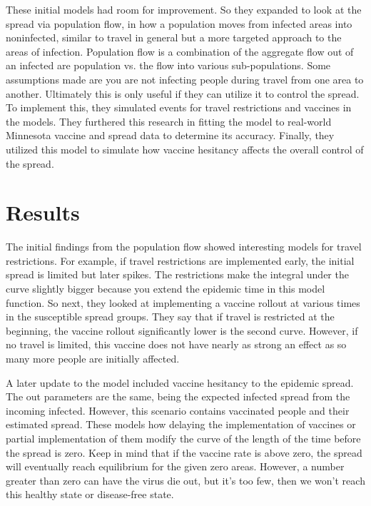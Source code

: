 \documentclass[journal,onecolumn]{IEEEtran}
\begin{document}
These initial models had room for improvement. So they expanded to look at the spread via population flow, in how a population moves from infected areas into noninfected, similar to travel in general but a more targeted approach to the areas of infection. Population flow is a combination of the aggregate flow out of an infected are population vs. the flow into various sub-populations. Some assumptions made are you are not infecting people during travel from one area to another. Ultimately this is only useful if they can utilize it to control the spread. To implement this, they simulated events for travel restrictions and vaccines in the models. They furthered this research in fitting the model to real-world Minnesota vaccine and spread data to determine its accuracy. Finally, they utilized this model to simulate how vaccine hesitancy affects the overall control of the spread. 

\section{Results}

The initial findings from the population flow showed interesting models for travel restrictions. For example, if travel restrictions are implemented early, the initial spread is limited but later spikes. The restrictions make the integral under the curve slightly bigger because you extend the epidemic time in this model function. So next, they looked at implementing a vaccine rollout at various times in the susceptible spread groups. They say that if travel is restricted at the beginning, the vaccine rollout significantly lower is the second curve. However, if no travel is limited, this vaccine does not have nearly as strong an effect as so many more people are initially affected. 

A later update to the model included vaccine hesitancy to the epidemic spread. The out parameters are the same, being the expected infected spread from the incoming infected. However, this scenario contains vaccinated people and their estimated spread. These models how delaying the implementation of vaccines or partial implementation of them modify the curve of the length of the time before the spread is zero. Keep in mind that if the vaccine rate is above zero, the spread will eventually reach equilibrium for the given zero areas. However, a number greater than zero can have the virus die out, but it's too few, then we won't reach this healthy state or disease-free state.
\end{document}
